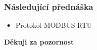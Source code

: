   \begin{frame}
    \frametitle{Následující přednáška}
		
		\begin{itemize}
			\item Protokol MODBUS RTU
		\end{itemize}
		
		\begin{center}
			\textbf{Děkuji za pozornost}
		\end{center}
		
	\end{frame}